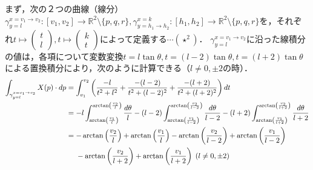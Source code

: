 \documentclass[dvipdfmx,a4paper,uplatex]{jsarticle}
\begin{document}
まず，次の２つの曲線（線分）${\gamma^{x=v_1\to v_2}_{y=l}}:{[v_1,v_2]}\to\mathbb{R}^2\setminus\{p,q,r\},{\gamma^{x=k}_{y=h_1\to h_2}}:{[h_1,h_2]}\to\mathbb{R}^2\setminus\{p,q,r\}$を，それぞれ$t\mapsto\begin{pmatrix}t\\l\end{pmatrix},t\mapsto\begin{pmatrix}k\\t\end{pmatrix}$によって定義する$\cdots(\star^2)$．
$\gamma^{x=v_1\to v_2}_{y=l}$に沿った線積分の値は，各項について変数変換$t=l\tan\theta,t=(l-2)\tan\theta,t=(l+2)\tan\theta$による置換積分により，次のように計算できる（$l\ne 0,\pm 2$の時）．
\begin{align}
    \int_{\gamma^{x=v_1\to v_2}_{y=l}} X(p)\cdot dp &= \int^{v_2}_{v_1}\left( \frac{-l}{t^2+l^2}+\frac{-(l-2)}{t^2+(l-2)^2}+\frac{-(l+2)}{t^2+(l+2)^2} \right)dt \\
    &= -l\int^{\arctan\left(\frac{v_2}{l}\right)}_{\arctan\left(\frac{v_1}{l}\right)}\frac{d\theta}{l} - (l-2)\int^{\arctan\left(\frac{v_2}{l-2}\right)}_{\arctan\left(\frac{v_1}{l-2}\right)}\frac{d\theta}{l-2} - (l+2)\int^{\arctan\left(\frac{v_2}{l+2}\right)}_{\arctan\left(\frac{v_1}{l+2}\right)}\frac{d\theta}{l+2}\\
    &= -\arctan\left(\frac{v_2}{l}\right) + \arctan\left(\frac{v_1}{l}\right) - \arctan\left(\frac{v_2}{l-2}\right) + \arctan\left(\frac{v_1}{l-2}\right) \\*
    &\hphantom{{}={}}- \arctan\left(\frac{v_2}{l+2}\right) + \arctan\left(\frac{v_1}{l+2}\right) \;(l\ne 0,\pm 2)
\end{align}
\end{document}
